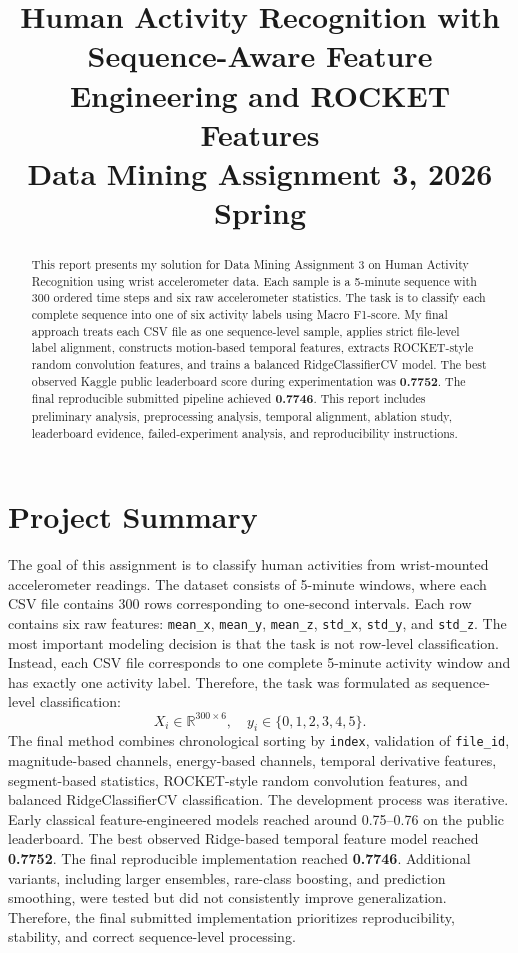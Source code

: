 \documentclass[conference]{IEEEtran}
\begin{document}
\title{
Human Activity Recognition with Sequence-Aware Feature Engineering and ROCKET Features\\
{\footnotesize Data Mining Assignment 3, 2026 Spring}
}
\author{
}
\maketitle
\begin{abstract}
This report presents my solution for Data Mining Assignment 3 on Human Activity Recognition using wrist accelerometer data. Each sample is a 5-minute sequence with 300 ordered time steps and six raw accelerometer statistics. The task is to classify each complete sequence into one of six activity labels using Macro F1-score. My final approach treats each CSV file as one sequence-level sample, applies strict file-level label alignment, constructs motion-based temporal features, extracts ROCKET-style random convolution features, and trains a balanced RidgeClassifierCV model. The best observed Kaggle public leaderboard score during experimentation was \textbf{0.7752}. The final reproducible submitted pipeline achieved \textbf{0.7746}. This report includes preliminary analysis, preprocessing analysis, temporal alignment, ablation study, leaderboard evidence, failed-experiment analysis, and reproducibility instructions.
\end{abstract}
\section{Project Summary}
The goal of this assignment is to classify human activities from wrist-mounted accelerometer readings. The dataset consists of 5-minute windows, where each CSV file contains 300 rows corresponding to one-second intervals. Each row contains six raw features: \texttt{mean\_x}, \texttt{mean\_y}, \texttt{mean\_z}, \texttt{std\_x}, \texttt{std\_y}, and \texttt{std\_z}.
The most important modeling decision is that the task is not row-level classification. Instead, each CSV file corresponds to one complete 5-minute activity window and has exactly one activity label. Therefore, the task was formulated as sequence-level classification:
\[
X_i \in \mathbb{R}^{300 \times 6}, \quad y_i \in \{0,1,2,3,4,5\}.
\]
The final method combines chronological sorting by \texttt{index}, validation of \texttt{file\_id}, magnitude-based channels, energy-based channels, temporal derivative features, segment-based statistics, ROCKET-style random convolution features, and balanced RidgeClassifierCV classification.
The development process was iterative. Early classical feature-engineered models reached around 0.75--0.76 on the public leaderboard. The best observed Ridge-based temporal feature model reached \textbf{0.7752}. The final reproducible implementation reached \textbf{0.7746}. Additional variants, including larger ensembles, rare-class boosting, and prediction smoothing, were tested but did not consistently improve generalization. Therefore, the final submitted implementation prioritizes reproducibility, stability, and correct sequence-level processing.
\end{document}
